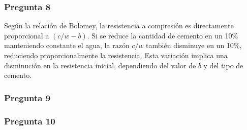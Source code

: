 \subsubsection*{Pregunta 8} 
Según la relación de Bolomey, la resistencia a compresión es directamente proporcional a \((c/w - b)\). Si se reduce la cantidad de cemento en un 10\% manteniendo constante el agua, la razón \( c/w \) también disminuye en un 10\%, reduciendo proporcionalmente la resistencia. Esta variación implica una disminución en la resistencia inicial, dependiendo del valor de \( b \) y del tipo de cemento.

\subsubsection*{Pregunta 9} 



\subsubsection*{Pregunta 10} 



